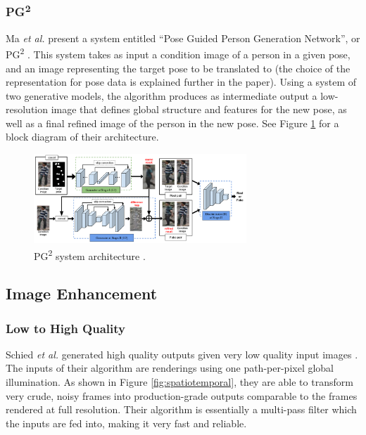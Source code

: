 \documentclass[letterpaper]{article} %
\begin{document}
\subsubsection{PG\textsuperscript{2}}
\label{subsubsec:pg2}
Ma \textit{et al.} 
present a system entitled
``Pose Guided Person Generation Network'', or PG\textsuperscript{2}
\cite{pose_guided_image_generation}.
This system takes as input a condition image
of a person in a given pose, and an image representing the target pose
to be translated to (the choice of the representation for pose data is explained further in the
paper). Using a system of two generative models,
the algorithm produces as intermediate output a low-resolution
image that defines global structure and features for the new pose, as well as a final refined
image of the person in the new pose. See Figure \ref{fig:pose_guided} for
a block diagram of their architecture.

\begin{figure}[htbp]
\centerline{\includegraphics[width=8cm]{pose_guided.png}}
\caption{PG\textsuperscript{2} system architecture \cite{pose_guided_image_generation}.}
\label{fig:pose_guided}
\end{figure}

\subsection{Image Enhancement}
\label{subsec:image_enhancement}
\subsubsection{Low to High Quality}
Schied \textit{et al.}
generated high quality outputs given very low quality input
images \cite{spatiotemporal}. The inputs of their algorithm are renderings using one path-per-pixel global
illumination. As shown in Figure \ref{fig:spatiotemporal}, they are able to
transform very crude, noisy frames into production-grade outputs comparable to
the frames rendered at full resolution. Their algorithm is essentially a
multi-pass filter which the inputs are fed into, making it very fast and
reliable.

\end{document}
